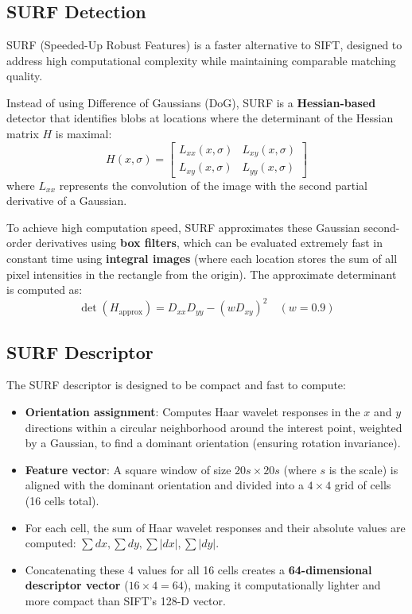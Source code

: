 
\section[Question -- {\it SURF Algorithm}]{}

\subsection{SURF Detection}
SURF (Speeded-Up Robust Features) is a faster alternative to SIFT, designed to address high computational complexity while maintaining comparable matching quality.

Instead of using Difference of Gaussians (DoG), SURF is a \textbf{Hessian-based} detector that identifies blobs at locations where the determinant of the Hessian matrix $H$ is maximal:
\[
  H(x, \sigma) = \begin{bmatrix} L_{xx}(x, \sigma) & L_{xy}(x, \sigma) \\ L_{xy}(x, \sigma) & L_{yy}(x, \sigma) \end{bmatrix}
\]
where $L_{xx}$ represents the convolution of the image with the second partial derivative of a Gaussian. 

To achieve high computation speed, SURF approximates these Gaussian second-order derivatives using \textbf{box filters}, which can be evaluated extremely fast in constant time using \textbf{integral images} (where each location stores the sum of all pixel intensities in the rectangle from the origin). The approximate determinant is computed as:
\[
  \det(H_{\text{approx}}) = D_{xx} D_{yy} - (w D_{xy})^2 \quad (w = 0.9)
\]

\subsection{SURF Descriptor}
The SURF descriptor is designed to be compact and fast to compute:
\begin{itemize}
    \item \textbf{Orientation assignment}: Computes Haar wavelet responses in the $x$ and $y$ directions within a circular neighborhood around the interest point, weighted by a Gaussian, to find a dominant orientation (ensuring rotation invariance).
    \item \textbf{Feature vector}: A square window of size $20s \times 20s$ (where $s$ is the scale) is aligned with the dominant orientation and divided into a $4 \times 4$ grid of cells (16 cells total).
    \item For each cell, the sum of Haar wavelet responses and their absolute values are computed: $\sum dx, \sum dy, \sum |dx|, \sum |dy|$.
    \item Concatenating these 4 values for all 16 cells creates a \textbf{64-dimensional descriptor vector} ($16 \times 4 = 64$), making it computationally lighter and more compact than SIFT's 128-D vector.
\end{itemize}